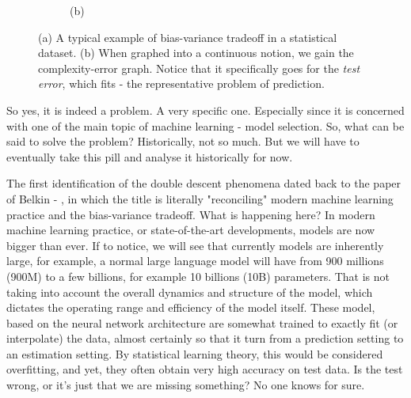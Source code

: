 \begin{figure}[h!]
\begin{subfigure}{0.4\textwidth}
      \caption*{(b)}
    \end{subfigure}
    \caption{(a) A typical example of bias-variance tradeoff in a statistical dataset. (b) When graphed into a continuous notion, we gain the complexity-error graph. Notice that it specifically goes for the \textit{test error}, which fits - the representative problem of prediction.}
  \end{figure}
So yes, it is indeed a problem. A very specific one. Especially since it is concerned with one of the main topic of machine learning - model selection. So, what can be said to solve the problem? Historically, not so much. But we will have to eventually take this pill and analyse it historically for now. 

The first identification of the double descent phenomena dated back to the paper of Belkin - \cite{belkin_reconciling_2019}, in which the title is literally "reconciling" modern machine learning practice and the bias-variance tradeoff. What is happening here? In modern machine learning practice, or state-of-the-art developments, models are now bigger than ever. If to notice, we will see that currently models are inherently large, for example, a normal large language model will have from 900 millions (900M) to a few billions, for example 10 billions (10B) parameters. That is not taking into account the overall dynamics and structure of the model, which dictates the operating range and efficiency of the model itself. These model, based on the neural network architecture are somewhat trained to exactly fit (or interpolate) the data, almost certainly so that it turn from a prediction setting to an estimation setting. By statistical learning theory, this would be considered overfitting, and yet, they often obtain very high accuracy on test data. Is the test wrong, or it's just that we are missing something? No one knows for sure. 

